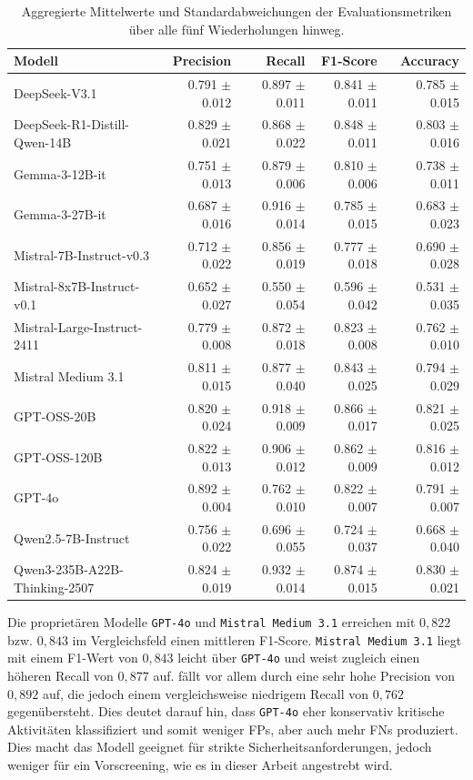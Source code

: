 \begin{table}[htbp]
    \centering
    \caption{Aggregierte Mittelwerte und Standardabweichungen der Evaluationsmetriken über alle fünf Wiederholungen hinweg.}
    \label{tab:metrics-overview}
    \begin{tabular}{l r r r r}
        \toprule
        Modell & Precision & Recall & F1-Score & Accuracy \\
        \midrule
        DeepSeek-V3.1 & 0.791 $\pm$ 0.012 & 0.897 $\pm$ 0.011 & 0.841 $\pm$ 0.011 & 0.785 $\pm$ 0.015 \\
        DeepSeek-R1-Distill-Qwen-14B & 0.829 $\pm$ 0.021 & 0.868 $\pm$ 0.022 & 0.848 $\pm$ 0.011 & 0.803 $\pm$ 0.016 \\
        Gemma-3-12B-it & 0.751 $\pm$ 0.013 & 0.879 $\pm$ 0.006 & 0.810 $\pm$ 0.006 & 0.738 $\pm$ 0.011 \\
        Gemma-3-27B-it & 0.687 $\pm$ 0.016 & 0.916 $\pm$ 0.014 & 0.785 $\pm$ 0.015 & 0.683 $\pm$ 0.023 \\
        Mistral-7B-Instruct-v0.3 & 0.712 $\pm$ 0.022 & 0.856 $\pm$ 0.019 & 0.777 $\pm$ 0.018 & 0.690 $\pm$ 0.028 \\
        Mistral-8x7B-Instruct-v0.1 & 0.652 $\pm$ 0.027 & 0.550 $\pm$ 0.054 & 0.596 $\pm$ 0.042 & 0.531 $\pm$ 0.035 \\
        Mistral-Large-Instruct-2411 & 0.779 $\pm$ 0.008 & 0.872 $\pm$ 0.018 & 0.823 $\pm$ 0.008 & 0.762 $\pm$ 0.010 \\
        Mistral Medium 3.1 & 0.811 $\pm$ 0.015 & 0.877 $\pm$ 0.040 & 0.843 $\pm$ 0.025 & 0.794 $\pm$ 0.029 \\
        GPT-OSS-20B & 0.820 $\pm$ 0.024 & 0.918 $\pm$ 0.009 & 0.866 $\pm$ 0.017 & 0.821 $\pm$ 0.025 \\
        GPT-OSS-120B & 0.822 $\pm$ 0.013 & 0.906 $\pm$ 0.012 & 0.862 $\pm$ 0.009 & 0.816 $\pm$ 0.012 \\
        GPT-4o & 0.892 $\pm$ 0.004 & 0.762 $\pm$ 0.010 & 0.822 $\pm$ 0.007 & 0.791 $\pm$ 0.007 \\
        Qwen2.5-7B-Instruct & 0.756 $\pm$ 0.022 & 0.696 $\pm$ 0.055 & 0.724 $\pm$ 0.037 & 0.668 $\pm$ 0.040 \\
        Qwen3-235B-A22B-Thinking-2507 & 0.824 $\pm$ 0.019 & 0.932 $\pm$ 0.014 & 0.874 $\pm$ 0.015 & 0.830 $\pm$ 0.021 \\
        \bottomrule
    \end{tabular}
\end{table}

Die proprietären Modelle \texttt{GPT-4o} und \texttt{Mistral Medium 3.1} erreichen mit $0{,}822$ bzw. $0{,}843$ im Vergleichsfeld einen mittleren F1-Score. \texttt{Mistral Medium 3.1} liegt mit
einem F1-Wert von $0{,}843$ leicht über \texttt{GPT-4o} und weist zugleich
einen höheren Recall von $0{,}877$ auf.  fällt vor allem durch eine sehr hohe Precision von $0{,}892$ auf, die jedoch einem vergleichsweise niedrigem Recall von $0{,}762$ gegenübersteht. Dies deutet darauf hin, dass \texttt{GPT-4o} eher konservativ kritische Aktivitäten klassifiziert und somit weniger \acp{FP}, aber auch mehr \acp{FN} produziert. Dies
macht das Modell geeignet für strikte Sicherheitsanforderungen, jedoch
weniger für ein Vorscreening, wie es in dieser Arbeit angestrebt wird.

